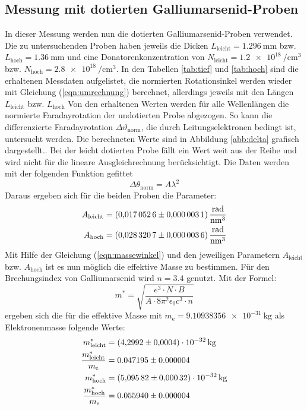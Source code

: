 \subsection{Messung mit dotierten Galliumarsenid-Proben}
\label{sec:dot}
In dieser Messung werden nun die dotierten Galliumarsenid-Proben verwendet.
Die zu untersuchenden Proben haben jeweils die Dicken $L_{\mathrm{leicht}}=\SI{1.296}{\milli\meter}$ bzw. $L_{\mathrm{hoch}}=\SI{1.36}{\milli\meter}$ und eine Donatorenkonzentration von $N_{\mathrm{leicht}}=\SI{1.2 e18}{\per\centi\cubic\meter}$ bzw. $N_{\mathrm{hoch}}=\SI{2.8 e18}{\per\centi\cubic\meter}$.
In den Tabellen \ref{tab:tief} und \ref{tab:hoch} sind die erhaltenen Messdaten aufgelistet, die normierten Rotationsinkel werden wieder mit Gleichung (\ref{eqn:umrechnung}) berechnet, allerdings jeweils mit den Längen $L_{\mathrm{leicht}}$ bzw. $L_{\mathrm{hoch}}$
Von den erhaltenen Werten werden für alle Wellenlängen die normierte Faradayrotation der undotierten Probe abgezogen.
So kann die differenzierte Faradayrotation $\Delta\vartheta_\mathrm{norm}$, die durch Leitungselektronen bedingt ist, untersucht werden.
Die berechneten Werte sind in Abbildung \ref{abb:delta} grafisch dargestellt..
Bei der leicht dotierten Probe fällt ein Wert weit aus der Reihe und wird nicht für die lineare Ausgleichrechnung berücksichtigt.
Die Daten werden mit der folgenden Funktion gefittet
\begin{equation}
  \Delta\theta_{\mathrm{norm}} = A\lambda^2
\end{equation}
Daraus ergeben sich für die beiden Proben die Parameter:
\begin{align*}
  A_{\mathrm{leicht}} &= \SI{0.0170526 \pm 0.0000031}{\radian\per\nano\cubic\meter} \\
  A_{\mathrm{hoch}} &= \SI{0.0283207 \pm 0.0000036}{\radian\per\nano\cubic\meter}
\end{align*}
Mit Hilfe der Gleichung (\ref{eqn:massewinkel}) und den jeweiligen Parametern $A_{\mathrm{leicht}}$ bzw. $A_{\mathrm{hoch}}$ ist es nun möglich die effektive Masse zu bestimmen.
Für den Brechungsindex von Galliumarsenid wird $n=3.4$ \cite{nGaAs} genutzt.
Mit der Formel:
\begin{equation}
  m^*=\sqrt{\frac{e^3\cdot N \cdot B}{A\cdot 8\pi^2\epsilon_\mathrm{0} c^3 \cdot n }}
\end{equation}
ergeben sich die für die effektive Masse mit $m_\mathrm{e} = \SI{9.10938356 e-31}{\kilogram}$ als Elektronenmasse folgende Werte:
\begin{align*}
  m^*_{\mathrm{leicht}} &= \SI{4.2992 \pm 0.0004 e-32}{\kilogram} \\
  \frac{m^*_{\mathrm{leicht}}}{m_\mathrm{e}} &= 0.047195\pm 0.000004 \\
  m^*_{\mathrm{hoch}} &= \SI{5.09582 \pm 0.00032 e-32}{\kilogram} \\
  \frac{m^*_{\mathrm{hoch}}}{m_\mathrm{e}} &= 0.055940\pm 0.000004\\
\end{align*}

